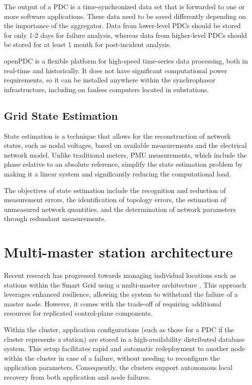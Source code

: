 The output of a PDC is a time-synchronized data set that is forwarded to one or more software applications. These data need to be saved differently depending on the importance of the aggregator. Data from lower-level PDCs should be stored for only 1-2 days for failure analysis, whereas data from higher-level PDCs should be stored for at least 1 month for post-incident analysis.

openPDC is a flexible platform for high-speed time-series data processing, both in real-time and historically. It does not have significant computational power requirements, so it can be installed anywhere within the synchrophasor infrastructure, including on fanless computers located in substations.

\subsection{Grid State Estimation}
State estimation is a technique that allows for the reconstruction of network states, such as nodal voltages, based on available measurements and the electrical network model. Unlike traditional meters, PMU measurements, which include the phase relative to an absolute reference, simplify the state estimation problem by making it a linear system and significantly reducing the computational load. 

The objectives of state estimation include the recognition and reduction of measurement errors, the identification of topology errors, the estimation of unmeasured network quantities, and the determination of network parameters through redundant measurements.

\section{Multi-master station architecture}
Recent research has progressed towards managing individual locations such as stations within the Smart Grid using a multi-master architecture \cite{a2-1}\cite{a2-2}. This approach leverages enhanced resilience, allowing the system to withstand the failure of a master node. However, it comes with the trade-off of requiring additional resources for replicated control-plane components.

Within the cluster, application configurations (such as those for a PDC if the cluster represents a station) are stored in a high-availability distributed database system. This setup facilitates rapid and automatic redeployment to another node within the cluster in case of a failure, without needing to reconfigure the application parameters. Consequently, the clusters support autonomous local recovery from both application and node failures.

